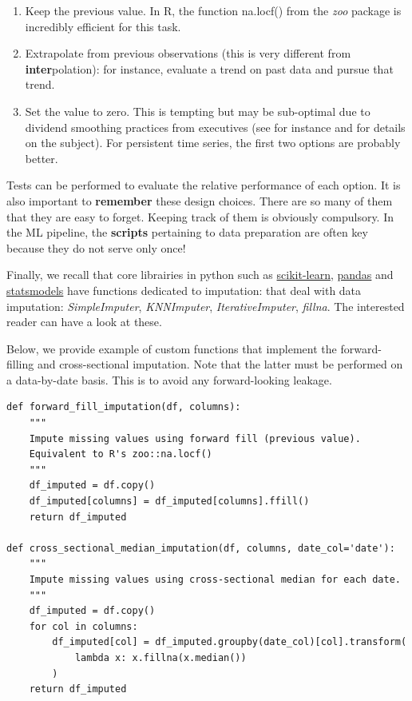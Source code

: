 \begin{enumerate}
\item Keep the previous value. In R, the function na.locf() from the \textit{zoo} package is incredibly efficient for this task.
\item Extrapolate from previous observations (this is very different from \textbf{inter}polation): for instance, evaluate a trend on past data and pursue that trend.
\item Set the value to zero. This is tempting but may be sub-optimal due to dividend smoothing practices from executives (see for instance \cite{leary2011determinants} and \cite{chen2012dividend} for details on the subject). For persistent time series, the first two options are probably better.
\end{enumerate}

Tests can be performed to evaluate the relative performance of each option. It is also important to \textbf{remember} these design choices. There are so many of them that they are easy to forget. Keeping track of them is obviously compulsory. In the ML pipeline, the \textbf{scripts} pertaining to data preparation are often key because they do not serve only once!

Finally, we recall that core librairies in python such as \href{https://scikit-learn.org/stable/}{scikit-learn}, \href{https://pandas.pydata.org/}{pandas} and \href{https://www.statsmodels.org/stable/index.html}{statsmodels} have functions dedicated to imputation: that deal with data imputation: \textit{SimpleImputer}, \textit{KNNImputer}, \textit{IterativeImputer}, \textit{fillna}. The interested reader can have a look at these.

Below, we provide example of custom functions that implement the forward-filling and cross-sectional imputation. Note that the latter must be performed on a data-by-date basis. This is to avoid any forward-looking leakage.

\begin{verbatim}
def forward_fill_imputation(df, columns):
    """
    Impute missing values using forward fill (previous value).
    Equivalent to R's zoo::na.locf()
    """
    df_imputed = df.copy()
    df_imputed[columns] = df_imputed[columns].ffill()
    return df_imputed

def cross_sectional_median_imputation(df, columns, date_col='date'):
    """
    Impute missing values using cross-sectional median for each date.
    """
    df_imputed = df.copy()
    for col in columns:
        df_imputed[col] = df_imputed.groupby(date_col)[col].transform(
            lambda x: x.fillna(x.median())
        )
    return df_imputed
\end{verbatim}

